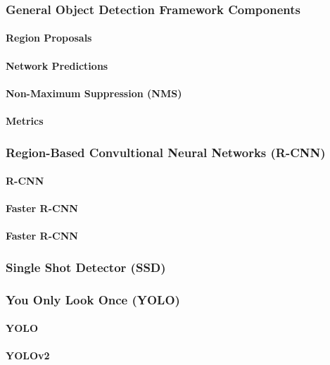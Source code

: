 \documentclass[a4paper,11pt,oneside]{article}
\begin{document}
  \subsubsection{General Object Detection Framework Components}

  \paragraph{Region Proposals}
  \paragraph{Network Predictions}
  \paragraph{Non-Maximum Suppression (NMS)}
  \paragraph{Metrics}

  \subsubsection{Region-Based Convultional Neural Networks (R-CNN)}

  \paragraph{R-CNN}
  \paragraph{Faster R-CNN}
  \paragraph{Faster R-CNN}

  \subsubsection{Single Shot Detector (SSD)}
  \subsubsection{You Only Look Once (YOLO)}

  \paragraph{YOLO}
  \paragraph{YOLOv2}
\end{document}
